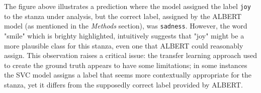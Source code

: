 The figure above illustrates a prediction where the model assigned the label \texttt{joy} to the stanza under analysis, but the correct label, assigned by the ALBERT model (as mentioned in the \textit{Methods} section), was \texttt{sadness}.
However, the word "smile" which is brighty highlighted, intuitively suggests that "joy" might be a more plausible class for this stanza, even one that ALBERT could reasonably assign. 
This observation raises a critical issue: the transfer learning approach used to create the ground truth appears to have some limitations; in some instances the SVC model assigns a label that seems more contextually appropriate for the stanza, 
yet it differs from the supposedly correct label provided by ALBERT.
